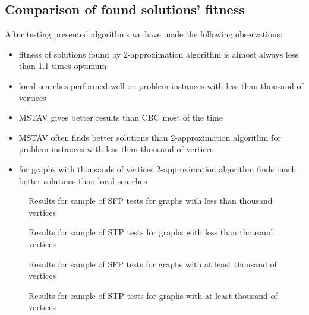 \subsection{Comparison of found solutions' fitness}
\FloatBarrier
After testing presented algorithms we have made the following observations:
\begin{itemize}
\item fitness of solutions found by 2-approximation algorithm is almost always less than 1.1 times optimum
\item local searches performed well on problem instances with less than thousand of vertices
\item MSTAV gives better results than CBC most of the time
\item MSTAV often finds better solutions than 2-approximation algorithm for problem instances with less than thousand of vertices
\item for graphs with thousands of vertices 2-approximation algorithm finds much better solutions than local searches
\end{itemize}

\begin{figure}[hb]
  \centering
  
  \caption{Results for sample of SFP tests for graphs with less than thousand vertices}
\end{figure}

\begin{figure}[hb]
  \centering
  
  \caption{Results for sample of STP tests for graphs with less than thousand vertices}
\end{figure}

\begin{figure}[hb]
  \centering
  
  \caption{Results for sample of SFP tests for graphs with at least thousand of vertices}
\end{figure}

\begin{figure}[hb]
  \centering
  
  \caption{Results for sample of STP tests for graphs with at least thousand of vertices}
\end{figure}
\FloatBarrier
